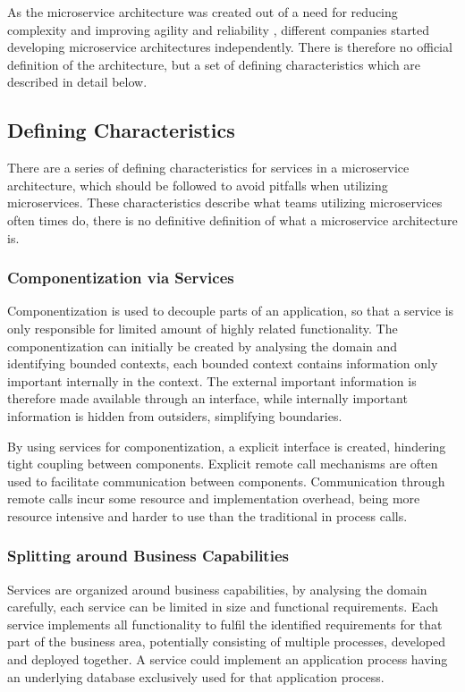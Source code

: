 {As the microservice architecture was created out of a need for reducing complexity and improving agility and reliability \cite[p.~68]{long2017cloud} \cite[p.~192]{newman2015microservices}, different companies started developing microservice architectures independently. There is therefore no official definition of the architecture, but a set of defining characteristics which are described in detail below.

\subsection{Defining Characteristics}
There are a series of defining characteristics for services in a microservice architecture, which should be followed to avoid pitfalls when utilizing microservices. These characteristics describe what teams utilizing microservices often times do, there is no definitive definition of what a microservice architecture is.

\subsubsection*{Componentization via Services}
Componentization is used to decouple parts of an application, so that a service is only responsible for limited amount of highly related functionality\cite{morgantini2013whatAreMicroServices}. The componentization can initially be created by analysing the domain and identifying bounded contexts\cite[p.~31]{newman2015microservices}, each bounded context contains information only important internally in the context. 
The external important information is therefore made available through an interface, while internally important information is hidden from outsiders, simplifying boundaries.

By using services for componentization, a explicit interface is created, hindering tight coupling between components. Explicit remote call mechanisms are often used to facilitate communication between components. Communication through remote calls incur some resource and implementation overhead, being more resource intensive and harder to use than the traditional in process calls.

\subsubsection*{Splitting around Business Capabilities}
Services are organized around business capabilities, by analysing the domain carefully, each service can be limited in size and functional requirements. Each service implements all functionality to fulfil the identified requirements for that part of the business area, potentially consisting of multiple processes, developed and deployed together. A service could implement an application process having an underlying database exclusively used for that application process\cite{fowler2014microservices}.

}
